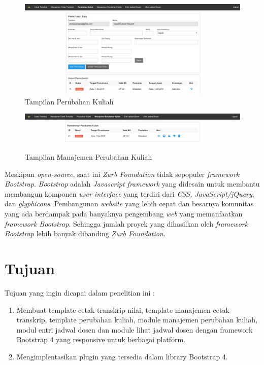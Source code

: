 \documentclass[a4paper,twoside]{article}
\begin{document}
	\begin{figure}[ht!]
		\includegraphics [scale=0.5] {Tampilan-Perubahan-Kuliah.PNG}
		\caption{Tampilan Perubahan Kuliah}
	\end{figure}
	
	\begin{figure}[ht!]
		\includegraphics [scale=0.5] {Tampilan-Manajemen-Perubahan-Kuliah.PNG}
		\caption{Tampilan Manajemen Perubahan Kuliah}
	\end{figure}
	
	
	
	
	Meskipun \textit{open-source}, saat ini \textit{Zurb Foundation} tidak sepopuler \textit{framework} \textit{Bootstrap}. 
	\textit{Bootstrap} adalah \textit{ Javascript framework} yang didesain untuk membantu membangun komponen \textit{user interface} yang terdiri dari \textit{CSS, JavaScript/jQuery}, dan \textit{glyphicons}. Pembangunan \textit{website} yang lebih cepat dan besarnya komunitas yang ada berdampak pada banyaknya pengembang \textit{web} yang memanfaatkan \textit{framework Bootstrap}. Sehingga jumlah proyek yang dihasilkan oleh\textit{ framework Bootstrap} lebih banyak dibanding \textit{Zurb Foundation}. 
	
	\section{Tujuan}
	Tujuan yang ingin dicapai dalam penelitian ini :
	\begin{enumerate}
		\item Membuat template cetak transkrip nilai, template manajemen cetak transkrip, template perubahan kuliah, module manajemen perubahan kuliah, modul entri jadwal dosen dan module lihat jadwal dosen dengan framework Bootstrap 4 yang responsive untuk berbagai platform.
		\item Mengimplentasikan plugin yang tersedia dalam library Bootstrap 4.	
	\end{enumerate}
	
\end{document}
